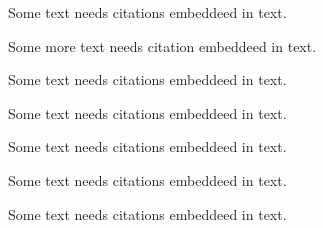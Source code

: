 \documentclass{article}
\begin{document}
Some text needs citations \cite{BOOK_REF:1} embeddeed in text.

Some more text needs citation \cite{BOOK_REF:2} embeddeed in text.

Some text needs citations \cite{BOOK_REF:3} embeddeed in text.

Some text needs citations \cite{ARTICLE_REF:1} embeddeed in text.

Some text needs citations \cite{ARTICLE_REF:2} embeddeed in text.

Some text needs citations \cite{WEBSITE_REF:1} embeddeed in text.

Some text needs citations \cite{WEBSITE_REF:2} embeddeed in text.

\newpage


\end{document}
